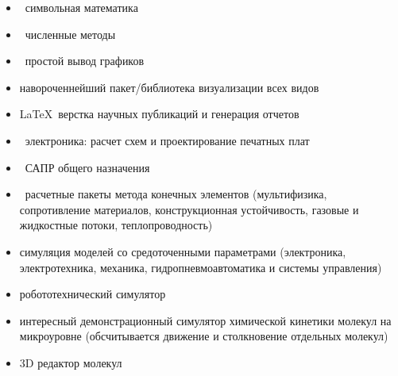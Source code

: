 
\begin{itemize}[nosep]
  \item \maxima\ символьная математика
  \item \octave\ численные методы
  \item \gnuplot\ простой вывод графиков
  \item {} навороченнейший пакет/библиотека визуализации всех
  видов
  \item \LaTeX\ верстка научных публикаций и генерация отчетов
  \item {}\ электроника: расчет схем и проектирование
  печатных плат
  \item {}\ САПР общего назначения
  \item {}\ расчетные пакеты метода конечных элементов
  (мультифизика, сопротивление материалов, конструкционная устойчивость,
  газовые и жидкостные потоки, теплопроводность)
  \item {} симуляция моделей со средоточенными
  параметрами
  (электроника, электротехника, механика, гидропневмоавтоматика и системы
  управления)
  \item {} робототехнический симулятор
  \item {}\note{\win} интересный демонстрационный симулятор
  химической кинетики молекул на микроуровне (обсчитывается движение и
  столкновение отдельных молекул)
  \item {} 3D редактор молекул
\end{itemize}


